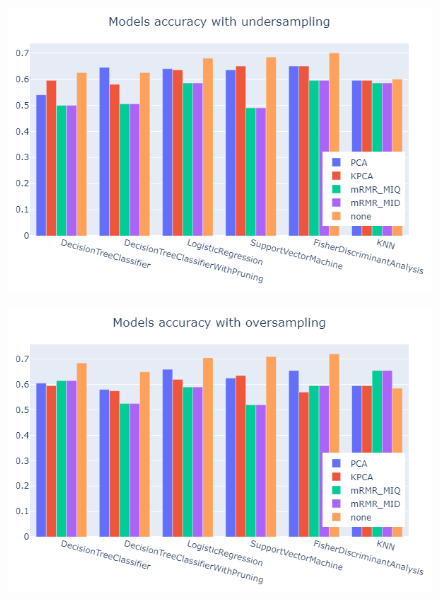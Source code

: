 \documentclass[letterpaper]{article}
\begin{document}
\begin{figure}[!h]
\begin{minipage}[t]{0.45\textwidth}
		\end{minipage}
		\begin{minipage}[t]{0.45\textwidth}
			\includegraphics[width=\textwidth]{images/models_accuracy_with_undersampling.png}
			\setlength{\abovecaptionskip}{-10pt}
			\label{fig:30}
		\end{minipage}
		\begin{minipage}{0.05\textwidth}
			\quad
		\end{minipage}
		\begin{minipage}[t]{0.45\textwidth}
			\includegraphics[width=\textwidth]{images/models_accuracy_with_oversampling.png}
			\setlength{\abovecaptionskip}{-10pt}
			\label{fig:31}
		\end{minipage}
	\end{figure}
	
	\clearpage
	\printbibliography
	\nocite{MohriRostamizadehTalwalkar18}
	\nocite{understandingml}
	\nocite{ghojogh2019fisher}
	
	
\end{document}
